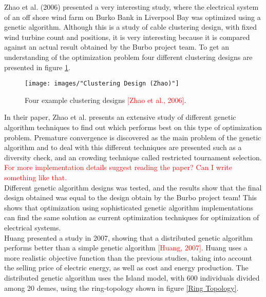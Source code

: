 \noindent Zhao et al. (2006) presented a very interesting study, where the electrical system of an off shore wind farm on Burko Bank in Liverpool Bay was optimized using a genetic algorithm. Although this is a study of cable clustering design, with fixed wind turbine count and positions, it is very interesting because it is compared against an actual result obtained by the Burbo project team. To get an understanding of the optimization problem four different clustering designs are presented in figure \ref{Clustering Design}.\\


\begin{figure}[h!]
\begin{center}
\texttt{[image: images/"Clustering Design (Zhao)"]}
\caption{Four example clustering designs \textcolor{red}{[Zhao et al., 2006]}.}
\label{Clustering Design}
\end{center}
\end{figure}


\noindent In their paper, Zhao et al. presents an extensive study of different genetic algorithm techniques to find out which performs best on this type of optimization problem. Premature convergence is discovered as the main problem of the genetic algorithm and to deal with this different techniques are presented such as a diversity check, and an crowding technique called restricted tournament selection. \textcolor{red}{For more implementation details suggest reading the paper? Can I write something like that.}\\

\noindent Different genetic algorithm designs was tested, and the results show that the final design obtained was equal to the design obtain by the Burbo project team! This shows that optimization using sophisticated genetic algorithm implementations can find the same solution as current optimization techniques for optimization of electrical systems.\\


\noindent Huang presented a study in 2007, showing that a distributed genetic algorithm performs better than a simple genetic algorithm \textcolor{red}{[Huang, 2007]}. Huang uses a more realistic objective function than the previous studies, taking into account the selling price of electric energy, as well as cost and energy production. The distributed genetic algorithm uses the Island model, with 600 individuals divided among 20 demes, using the ring-topology shown in figure \ref{Ring Topology}.\\

